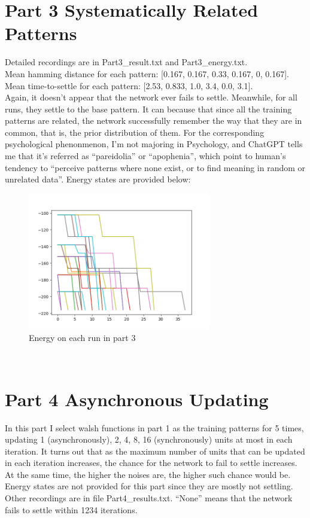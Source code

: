 \documentclass{article}
\begin{document}
\section*{Part 3 Systematically Related Patterns}
Detailed recordings are in Part3\_result.txt and Part3\_energy.txt.\\
Mean hamming distance for each pattern: [0.167, 0.167, 0.33, 0.167, 0, 0.167].\\
Mean time-to-settle for each pattern: [2.53, 0.833, 1.0, 3.4, 0.0, 3.1].\\
Again, it doesn't appear that the network ever fails to settle. Meanwhile, for all runs, they settle to the base pattern.
It can because that since all the training patterns are related, the network successfully remember the way that they are in common, that is, the prior distribution of them.
For the corresponding psychological phenonmenon, I'm not majoring in Psychology, and ChatGPT tells me that it's referred as ``pareidolia'' or ``apophenia'', which point to human's tendency to ``perceive patterns where none exist, or to find meaning in random or unrelated data''.
Energy states are provided below:
\begin{figure}[h]
    \centering
    \includegraphics[width=8cm]{Part3energy}
    \caption{Energy on each run in part 3}
\end{figure}\\

\section*{Part 4 Asynchronous Updating}
In this part I select walsh functions in part 1 as the training patterns for 5 times, updating 1 (asynchronously), 2, 4, 8, 16 (synchronously) units at most in each iteration.
It turns out that as the maximum number of units that can be updated in each iteration increases, the chance for the network to fail to settle increases.
At the same time, the higher the noises are, the higher such chance would be. Energy states are not provided for this part since they are mostly not settling.
Other recordings are in file Part4\_results.txt. ``None'' means that the network fails to settle within 1234 iterations.
\end{document}
